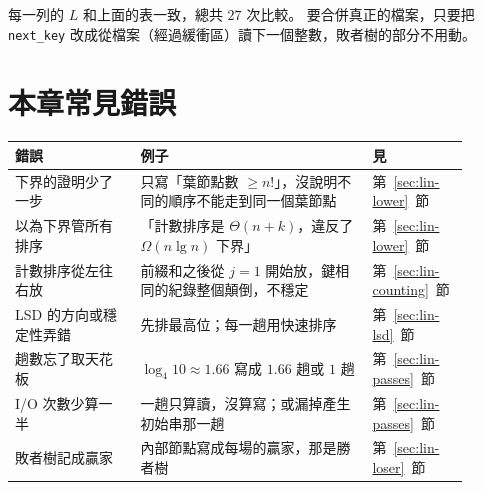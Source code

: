 
每一列的 $L$ 和上面的表一致，總共 $27$ 次比較。 要合併真正的檔案，只要把
\texttt{next\_key} 改成從檔案（經過緩衝區）讀下一個整數，敗者樹的部分不用動。

\section{本章常見錯誤}
\label{sec:lin-pitfalls}

\begin{center}
\begin{tabular}{p{0.26\linewidth}p{0.48\linewidth}p{0.16\linewidth}}
\toprule
錯誤 & 例子 & 見 \\
\midrule
下界的證明少了一步 & 只寫「葉節點數 $\ge n!$」，沒說明不同的順序不能走到同一個葉節點 &
第~\ref{sec:lin-lower}~節 \\
以為下界管所有排序 & 「計數排序是 $\Theta(n + k)$，違反了 $\Omega(n \lg n)$ 下界」 &
第~\ref{sec:lin-lower}~節 \\
計數排序從左往右放 & 前綴和之後從 $j = 1$ 開始放，鍵相同的紀錄整個顛倒，不穩定 &
第~\ref{sec:lin-counting}~節 \\
LSD 的方向或穩定性弄錯 & 先排最高位；每一趟用快速排序 & 第~\ref{sec:lin-lsd}~節 \\
趟數忘了取天花板 & $\log_4 10 \approx 1.66$ 寫成 $1.66$ 趟或 $1$ 趟 &
第~\ref{sec:lin-passes}~節 \\
I/O 次數少算一半 & 一趟只算讀，沒算寫；或漏掉產生初始串那一趟 &
第~\ref{sec:lin-passes}~節 \\
敗者樹記成贏家 & 內部節點寫成每場的贏家，那是勝者樹 & 第~\ref{sec:lin-loser}~節 \\
\bottomrule
\end{tabular}
\end{center}

